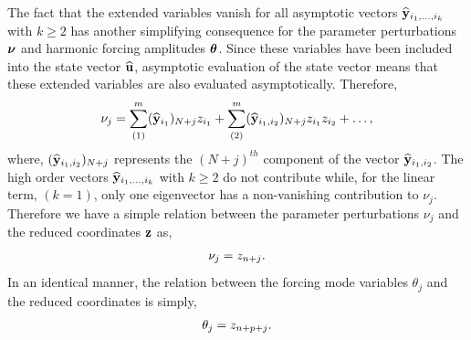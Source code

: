 The fact that the extended variables vanish for all asymptotic vectors $\widehat{\mathbf{y}}_{i_{1},\ldots,i_{k}}$ with $k\ge2$ has another simplifying consequence for the parameter perturbations $\boldsymbol{\nu}$ and harmonic forcing amplitudes $\boldsymbol{\theta}$. Since these variables have been included into the state vector $\widehat{\mathbf{u}}$, asymptotic evaluation of the state vector means that these extended variables are also evaluated asymptotically. Therefore,
\begin{align}
	\nu_{j} = \sum_{(1)}^{m}(\widehat{\mathbf{y}}_{i_{1}})_{N+j}z_{i_{1}} + \sum_{(2)}^{m}(\widehat{\mathbf{y}}_{i_{1},i_{2}})_{N+j}z_{i_{1}}z_{i_{2}} + \ldots,
\end{align}
where, $(\widehat{\mathbf{y}}_{i_{1},i_{2}})_{N+j}$ represents the $(N+j)^{th}$ component of the vector $\widehat{\mathbf{y}}_{i_{1},i_{2}}$. The high order vectors $\widehat{\mathbf{y}}_{i_{1},\ldots,i_{k}}$ with $k\ge2$ do not contribute while, for the linear term, $(k=1)$, only one eigenvector has a non-vanishing contribution to $\nu_{j}$. Therefore we have a simple relation between the parameter perturbations $\nu_{j}$ and the reduced coordinates $\mathbf{z}$ as,
\begin{align}
	\label{eqn:parameter_reduced_representation}
	\nu_{j} = z_{n+j}.
\end{align}
In an identical manner, the relation between the forcing mode variables $\theta_{j}$ and the reduced coordinates is simply,
\begin{align}
	\label{eqn:theta_reduced_representation}
	\theta_{j} = z_{n+p+j}.
\end{align}











